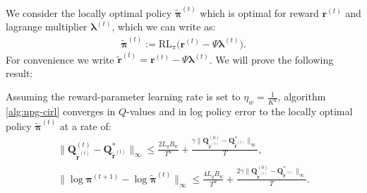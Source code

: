 We consider the locally optimal policy $\tilde{\bm{\pi}}^{(t)}$ which is optimal for reward $\bm{r}^{(t)}$ and lagrange multiplier $\bm{\lambda}^{(t)}$, which we can write as:
\begin{align*}
    \tilde{\bm{\pi}}^{(t)} := \text{RL}_\pi \bigl( \bm{r}^{(t)} - \Psi \bm{\lambda}^{(t)} \bigr).
\end{align*}
For convenience we write $\tilde{\bm{r}}^{(t)} = \bm{r}^{(t)} - \Psi \bm{\lambda}^{(t)}$. We will prove the following result:

\begin{lemma}
    \label{lemma:policy_converges_to_local_opt}
    Assuming the reward-parameter learning rate is set to $\eta_w = \frac{1}{K^u}$, algorithm \ref{alg:npg-cirl} converges in $Q$-values and in log policy error to the locally optimal policy $\tilde{\bm{\pi}}^{(t)}$ at a rate of:
    \begin{align*}
            \|\bm{Q}^{(t)}_{\tilde{\bm{r}}^{(t)}}
        - \bm{Q}^*_{\tilde{\bm{r}}^{(t)}} \|_\infty 
        \leq
        \frac{2 L_q B_w}{T^u} +
        \frac{\gamma 
        \|\bm{Q}^{(0)}_{\tilde{\bm{r}}^{(t)}}
        - \bm{Q}^*_{\tilde{\bm{r}}^{(t)}} \|_\infty
        }{T}, \\
        \| \log \bm{\pi}^{(t+1)} - \log \tilde{\bm{\pi}}^{(t)} \|_\infty 
        \leq
        \frac{4 L_q B_w}{T^u} +
        \frac{2 \gamma 
        \|\bm{Q}^{(0)}_{\tilde{\bm{r}}^{(t)}}
        - \bm{Q}^*_{\tilde{\bm{r}}^{(t)}} \|_\infty
        }{T}.
    \end{align*}
\end{lemma}

